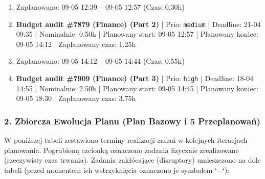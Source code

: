 {\begin{enumerate}
  \item [\textbf{PRZERWA}] Zaplanowano: 09-05 12:39 -- 09-05 12:57 (Czas: 0.30h)
  \item [\textbf{14644}] \textbf{Budget audit \#7879 (Finance) (Part 2)} | Prio: \texttt{medium} | Deadline: 21-04 09:35 | Nominalnie: 0.50h | Planowany start: 09-05 12:57 | Planowany koniec: 09-05 14:12 | Zaplanowany czas: 1.25h
  \item [\textbf{PRZERWA}] Zaplanowano: 09-05 14:12 -- 09-05 14:44 (Czas: 0.55h)
  \item [\textbf{14616}] \textbf{Budget audit \#7909 (Finance) (Part 3)} | Prio: \texttt{high} | Deadline: 18-04 14:55 | Nominalnie: 2.50h | Planowany start: 09-05 14:45 | Planowany koniec: 09-05 18:30 | Zaplanowany czas: 3.75h
\end{enumerate}
}

\subsubsection*{2. Zbiorcza Ewolucja Planu (Plan Bazowy i 5 Przeplanowań)}

W poniższej tabeli zestawiono terminy realizacji zadań w kolejnych iteracjach planowania. Pogrubioną czcionką oznaczono zadania fizycznie zrealizowane (rzeczywisty czas trwania). Zadania zakłócające (disruptory) umieszczono na dole tabeli (przed momentem ich wstrzyknięcia oznaczono je symbolem `$-$`):


